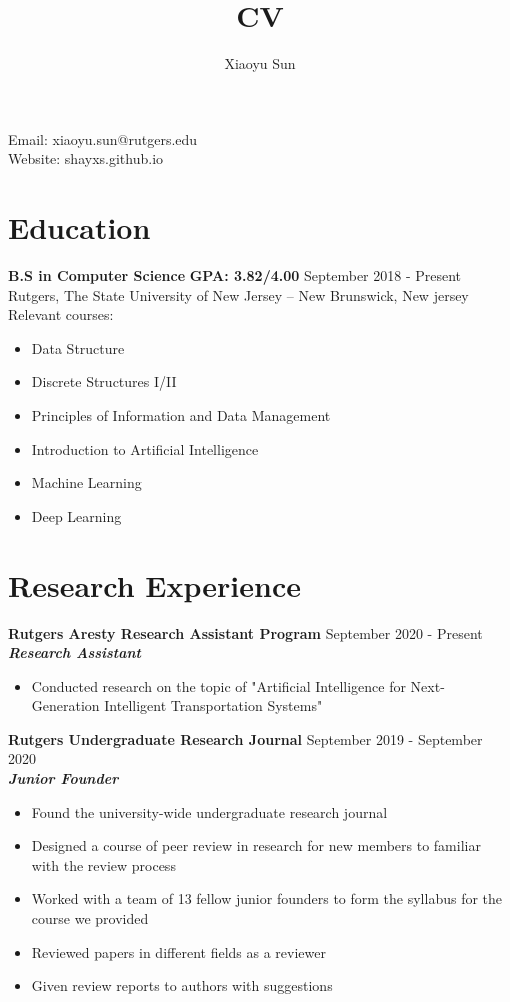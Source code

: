 \documentclass{article}
\makeatletter
\renewcommand{\maketitle}{
\begin{center}
{\huge\bfseries
\theauthor}

\vspace{.25em}

Email: xiaoyu.sun@rutgers.edu\\
Website: shayxs.github.io
\end{center}
}
\makeatother
\begin{document}
\title{CV}
\author{Xiaoyu Sun}
\maketitle

\section{Education}
\textbf{B.S in Computer Science} \space \textbf{GPA: 3.82/4.00}
\hfill{September 2018 - Present}\\
Rutgers, The State University of New Jersey – New Brunswick, New jersey\\
Relevant courses:
\begin{itemize}
  \itemsep0em
  \item Data Structure
  \item Discrete Structures I/II
  \item Principles of Information and Data Management
  \item Introduction to Artificial Intelligence
  \item Machine Learning
  \item Deep Learning
\end{itemize}


\section{Research Experience}
\textbf{Rutgers Aresty Research Assistant Program}
\hfill{September 2020 - Present}\\
\textit{\textbf{Research Assistant}}
\begin{itemize}
  \itemsep0em
  \item Conducted research on the topic of "Artificial Intelligence for Next-Generation Intelligent Transportation Systems"\\
\end{itemize}

\noindent \textbf{Rutgers Undergraduate Research Journal}
\hfill{September 2019 - September 2020}\\
\textit{\textbf{Junior Founder}}
\begin{itemize}
  \itemsep0em
  \item Found the university-wide undergraduate research journal
  \item Designed a course of peer review in research for new members to familiar with the
review process
  \item  Worked with a team of 13 fellow junior founders to form the syllabus for the course we
provided
  \item Reviewed papers in different fields as a reviewer
  \item Given review reports to authors with suggestions
\end{itemize}
\end{document}
